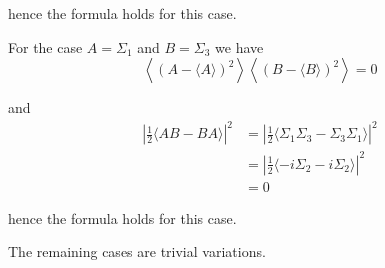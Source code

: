 hence the formula holds for this case.

\bigskip
For the case $A=\Sigma_1$ and $B=\Sigma_3$ we have
\begin{equation*}
\left\langle(A-\langle A\rangle)^2\right\rangle
\left\langle(B-\langle B\rangle)^2\right\rangle=0
\end{equation*}

and
\begin{align*}
\left|\tfrac{1}{2}\langle AB-BA\rangle\right|^2
&=\left|\tfrac{1}{2}\langle\Sigma_1\Sigma_3-\Sigma_3\Sigma_1\rangle\right|^2
\\
&=\left|\tfrac{1}{2}\langle -i\Sigma_2-i\Sigma_2\rangle\right|^2
\\
&=0
\end{align*}

hence the formula holds for this case.

\bigskip
The remaining cases are trivial variations.


